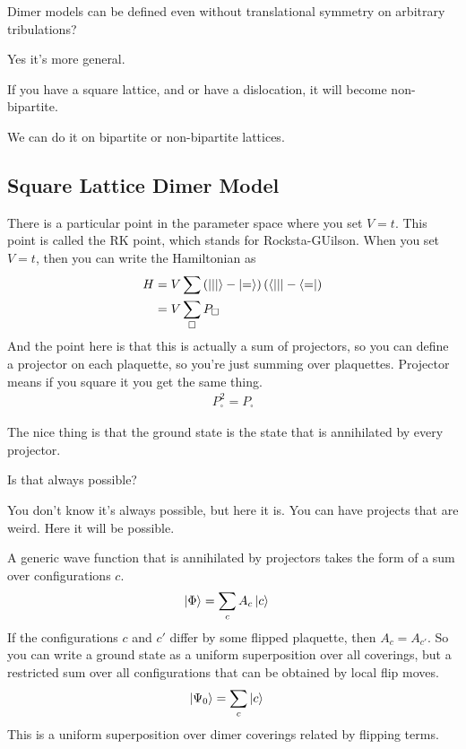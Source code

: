 \begin{question}
    Dimer models can be defined even without translational symmetry
    on arbitrary tribulations?
\end{question}
Yes it's more general.

\begin{question}
    If you have a square lattice,
    and or have a dislocation,
    it will become non-bipartite.
\end{question}
We can do it on bipartite or non-bipartite lattices.

\subsection{Square Lattice Dimer Model}
There is a particular point in the parameter space where you set $V=t$.
This point is called the RK point, which stands for Rocksta-GUilson.
When you set $V=t$,
then you can write the Hamiltonian as
\begin{align}
    H &=
    V\sum
    \left( 
    \ket{||}
    -\ket{=}
    \right)
    \left( 
    \bra{||}
    -
    \bra{=}
    \right)\\
    &= V \sum_{\square} P_{\square}
\end{align}
And the point here is that this is actually a sum of projectors,
so you can define a projector on each plaquette,
so you're just summing over plaquettes.
Projector means if you square it you get the same thing.
\begin{align}
    P_{\square}^2 = P_{\square}
\end{align}

The nice thing is that the ground state is the state that is annihilated by
every projector.

\begin{question}
    Is that always possible?
\end{question}
You don't know it's always possible,
but here it is.
You can have projects that are weird.
Here it will be possible.

A generic wave function that is annihilated by projectors takes the form
of a sum over configurations $c$.
\begin{align}
    \ket{\Phi} &= \sum_{c} A_c \ket{c}
\end{align}
If the configurations $c$ and $c'$ differ by some flipped plaquette,
then $A_c = A_{c'}$.
So you can write a ground state as a uniform superposition over all coverings,
but a restricted sum over all configurations that can be obtained by local flip
moves.
\begin{align}
    \ket{\Psi_0}
    &=
    \sum_{c} \ket{c}
\end{align}
This is a uniform superposition over dimer coverings related by flipping terms.

